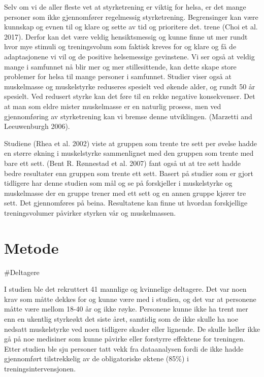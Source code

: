 \documentclass[
  letterpaper,
  DIV=11,
  numbers=noendperiod]{scrreprt}
\begin{document}
Selv om vi de aller fleste vet at styrketrening er viktig for helsa, er
det mange personer som ikke gjennomfører regelmessig styrketrening.
Begrensinger kan være kunnskap og evnen til og klare og sette av tid og
prioritere det. trene (Choi et al. 2017). Derfor kan det være veldig
hensiktsmessig og kunne finne ut mer rundt hvor mye stimuli og
treningsvolum som faktisk kreves for og klare og få de adaptasjonene vi
vil og de positive helsemessige gevinstene. Vi ser også at veldig mange
i samfunnet nå blir mer og mer stillesittende, kan dette skape store
problemer for helsa til mange personer i samfunnet. Studier viser også
at muskelmasse og muskelstyrke reduseres spesielt ved økende alder, og
rundt 50 år spesielt. Ved redusert styrke kan det føre til en rekke
negative konsekvenser. Det at man som eldre mister muskelmasse er en
naturlig prosess, men ved gjennomføring av styrketrening kan vi bremse
denne utviklingen. (Marzetti and Leeuwenburgh 2006).

Studiene (Rhea et al. 2002) viste at gruppen som trente tre sett per
øvelse hadde en større økning i muskelstyrke sammenlignet med den
gruppen som trente med bare ett sett. (Bent R. Rønnestad et al. 2007)
fant også ut at tre sett hadde bedre resultater enn gruppen som trente
ett sett. Basert på studier som er gjort tidligere har denne studien som
mål og se på forskjeller i muskelstyrke og muskelmasse der en gruppe
trener med ett sett og en annen gruppe kjører tre sett. Det gjennomføres
på beina. Resultatene kan finne ut hvordan forskjellige treningsvolumer
påvirker styrken vår og muskelmassen.

\section{Metode}\label{metode-5}

\#Deltagere

I studien ble det rekruttert 41 mannlige og kvinnelige deltagere. Det
var noen krav som måtte dekkes for og kunne være med i studien, og det
var at personene måtte være mellom 18-40 år og ikke røyke. Personene
kunne ikke ha trent mer enn en ukentlig styrkeøkt det siste året,
samtidig som de ikke skulle ha noe nedsatt muskelstyrke ved noen
tidligere skader eller lignende. De skulle heller ikke gå på noe
medisiner som kunne påvirke eller forstyrre effektene for treningen.
Etter studien ble sju personer tatt vekk fra dataanalysen fordi de ikke
hadde gjennomført tilstrekkelig av de obligatoriske øktene (85\%) i
treningsintervensjonen.
\end{document}
